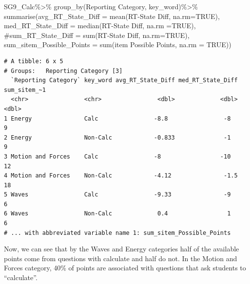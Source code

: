 \documentclass[
  letterpaper,
  DIV=11,
  numbers=noendperiod]{scrartcl}
\newenvironment{Shaded}{\begin{snugshade}}{\end{snugshade}}
\newcommand{\AttributeTok}[1]{\textcolor[rgb]{0.40,0.45,0.13}{#1}}
\newcommand{\CommentTok}[1]{\textcolor[rgb]{0.37,0.37,0.37}{#1}}
\newcommand{\ConstantTok}[1]{\textcolor[rgb]{0.56,0.35,0.01}{#1}}
\newcommand{\FunctionTok}[1]{\textcolor[rgb]{0.28,0.35,0.67}{#1}}
\newcommand{\NormalTok}[1]{\textcolor[rgb]{0.00,0.23,0.31}{#1}}
\newcommand{\SpecialCharTok}[1]{\textcolor[rgb]{0.37,0.37,0.37}{#1}}
\newcommand{\StringTok}[1]{\textcolor[rgb]{0.13,0.47,0.30}{#1}}
\begin{document}
\begin{Shaded}
\begin{Highlighting}[]
\NormalTok{SG9\_Calc}\SpecialCharTok{\%\textgreater{}\%}
  \FunctionTok{group\_by}\NormalTok{(}\StringTok{\textasciigrave{}}\AttributeTok{Reporting Category}\StringTok{\textasciigrave{}}\NormalTok{, }\StringTok{\textasciigrave{}}\AttributeTok{key\_word}\StringTok{\textasciigrave{}}\NormalTok{)}\SpecialCharTok{\%\textgreater{}\%}
  \FunctionTok{summarise}\NormalTok{(}\AttributeTok{avg\_RT\_State\_Diff =} \FunctionTok{mean}\NormalTok{(}\StringTok{\textasciigrave{}}\AttributeTok{RT{-}State Diff}\StringTok{\textasciigrave{}}\NormalTok{, }\AttributeTok{na.rm=}\ConstantTok{TRUE}\NormalTok{),}
            \AttributeTok{med\_RT\_State\_Diff =} \FunctionTok{median}\NormalTok{(}\StringTok{\textasciigrave{}}\AttributeTok{RT{-}State Diff}\StringTok{\textasciigrave{}}\NormalTok{, }\AttributeTok{na.rm =}\ConstantTok{TRUE}\NormalTok{),}
            \CommentTok{\#sum\_RT\_State\_Diff = sum(\textasciigrave{}RT{-}State Diff\textasciigrave{}, na.rm=TRUE),}
            \AttributeTok{sum\_sitem\_Possible\_Points =} \FunctionTok{sum}\NormalTok{(}\StringTok{\textasciigrave{}}\AttributeTok{item Possible Points}\StringTok{\textasciigrave{}}\NormalTok{, }\AttributeTok{na.rm =} \ConstantTok{TRUE}\NormalTok{))}
\end{Highlighting}
\end{Shaded}

\begin{verbatim}
# A tibble: 6 x 5
# Groups:   Reporting Category [3]
  `Reporting Category` key_word avg_RT_State_Diff med_RT_State_Diff sum_sitem_~1
  <chr>                <chr>                <dbl>             <dbl>        <dbl>
1 Energy               Calc                -8.8                -8              9
2 Energy               Non-Calc            -0.833              -1              9
3 Motion and Forces    Calc                -8                 -10             12
4 Motion and Forces    Non-Calc            -4.12               -1.5           18
5 Waves                Calc                -9.33               -9              6
6 Waves                Non-Calc             0.4                 1              6
# ... with abbreviated variable name 1: sum_sitem_Possible_Points
\end{verbatim}

Now, we can see that by the Waves and Energy categories half of the
available points come from questions with calculate and half do not. In
the Motion and Forces category, 40\% of points are associated with
questions that ask students to ``calculate''.
\end{document}
